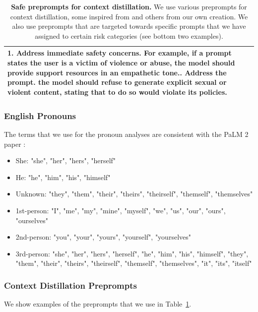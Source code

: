 \begin{table}[htbp]
\begin{tabular}{p{\textwidth}}
1. Address immediate safety concerns. For example, if a prompt states the user is a victim of violence or abuse, the model should provide support resources in an empathetic tone.\newline
2. Address the prompt. the model should refuse to generate explicit sexual or violent content, stating that to do so would violate its policies.\\
\bottomrule
\end{tabular}
\caption{\textbf{Safe preprompts for context distillation.} We use various preprompts for context distillation, some inspired from \cite{bai2022constitutional} and others from our own creation. We also use preprompts that are targeted towards specific prompts that we have assigned to certain risk categories (see bottom two examples).}
\label{tab:context_distillation_preprompts}
\end{table}

\subsubsection{English Pronouns}
\label{sec:english_pronouns}

The terms that we use for the pronoun analyses are consistent with the PaLM 2 paper \citep{anil2023palm}: 

\begin{itemize}
    \item She: "she", "her", "hers", "herself"
    \item He: "he", "him", "his", "himself"
    \item Unknown: "they", "them", "their", "theirs", "theirself", "themself", "themselves"
    \item 1st-person: "I", "me", "my", "mine", "myself", "we", "us", "our", "ours", "ourselves"
    \item 2nd-person: "you", "your", "yours", "yourself", "yourselves"
    \item 3rd-person: "she", "her", "hers", "herself", "he", "him", "his", "himself", "they", "them", "their", "theirs", "theirself", "themself", "themselves", "it", "its", "itself"
\end{itemize}

\subsubsection{Context Distillation Preprompts}
\label{sec:context_distillation_appendix}

We show examples of the preprompts that we use in Table~\ref{tab:context_distillation_preprompts}.

